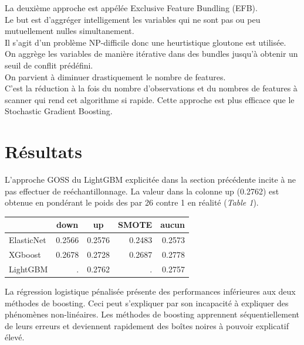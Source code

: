 \documentclass[french]{article}
\begin{document}
\begin{multicols}{2}
La deuxième approche est appélée Exclusive Feature Bundling (EFB)\footnotemark[14].\\
Le but est d'aggréger intelligement les variables qui ne sont pas ou peu mutuellement nulles simultanement.\\
Il s'agit d'un problème NP-difficile donc une heurtistique gloutone est utilisée.\\
On aggrège les variables de manière itérative dans des \og bundles \fg{} jusqu'à obtenir un seuil de conflit prédéfini.\\
On parvient à diminuer drastiquement le nombre de features.\\
C'est la réduction à la fois du nombre d'observations et du nombres de features à scanner qui rend cet algorithme si rapide. Cette approche est plus efficace que le Stochastic Gradient Boosting.







\section{Résultats}

L'approche GOSS du LightGBM explicitée dans la section précédente incite à ne pas effectuer de reéchantillonnage. La valeur dans la colonne \og up \fg{} (0.2762) est obtenue en pondérant le poids des  \fg{} par 26 contre 1 en réalité (\emph{Table 1}).

\begin{center}\begin{tabular}{|l|r|r|r|r|} \hline
  & \multicolumn{1}{c|}{down} & \multicolumn{1}{c|}{up} & \multicolumn{1}{c|}{SMOTE} & \multicolumn{1}{c|}{aucun} \\ \hline
  ElasticNet & 0.2566 & 0.2576 & 0.2483 & 0.2573 \\
  XGboost & 0.2678 & 0.2728 & 0.2687 & 0.2778 \\
  LightGBM & . & 0.2762 & . & 0.2757 \\ \hline

\end{tabular}\end{center}



La régression logistique pénalisée présente des performances inférieures aux deux méthodes de boosting. Ceci peut s'expliquer par son incapacité à expliquer des phénomènes non-linéaires. Les méthodes de boosting apprennent séquentiellement de leurs erreurs et deviennent rapidement des boîtes noires à pouvoir explicatif élevé.


\end{multicols}
\end{document}
